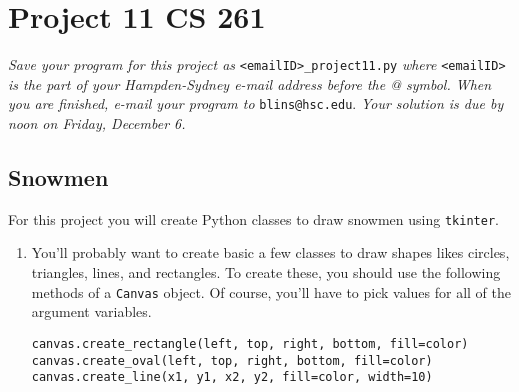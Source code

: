 \documentclass[12pt]{article}
\begin{document}
\section*{Project 11 \hfill CS 261}

\textit{Save your program for this project as} \verb|<emailID>_project11.py| \textit{where} \verb|<emailID>| \textit{is the part of your Hampden-Sydney e-mail address before the @ symbol. When you are finished, e-mail your program to} \verb|blins@hsc.edu|. \textit{Your solution is due by noon on Friday, December 6. }

\subsection*{Snowmen}

For this project you will create Python classes to draw snowmen using \verb|tkinter|.  

\begin{enumerate}

\item You'll probably want to create basic a few classes to draw shapes likes circles, triangles, lines, and rectangles.  To create these, you should use the following methods of a \verb|Canvas| object. Of course, you'll have to pick values for all of the argument variables. 

\begin{verbatim}
canvas.create_rectangle(left, top, right, bottom, fill=color)
canvas.create_oval(left, top, right, bottom, fill=color)
canvas.create_line(x1, y1, x2, y2, fill=color, width=10)
\end{verbatim}


\end{enumerate}
\end{document}
